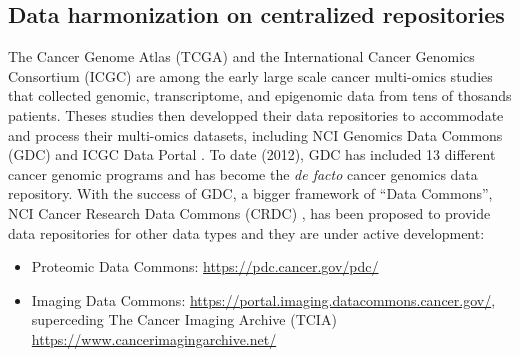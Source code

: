 \subsection{Data harmonization on centralized repositories}
The Cancer Genome Atlas (TCGA) \cite{hutterc_zenklusenjc:CancerGenome2018} and the International Cancer Genomics Consortium (ICGC) \cite{internationalcancergenomeconsortium_yangh:InternationalNetwork2010} are among the early large scale cancer multi-omics studies that collected genomic, transcriptome, and epigenomic data from tens of thosands patients. Theses studies then developped their data repositories to accommodate and process their multi-omics datasets, including NCI Genomics Data Commons (GDC)\footnotemark{} \cite{grossmanrl_staudtlm:SharedVision2016,heathap_grossmanrl:NCIGenomic2021} and ICGC Data Portal \cite{jolyy_chalmersd:DataSharing2012}. To date (2012), GDC has included 13 different cancer genomic programs and has become the \textit{de facto} cancer genomics data repository. With the success of GDC, a bigger framework of ``Data Commons'', NCI Cancer Research Data Commons (CRDC) \cite{hinksoniv_kibbewa:ComprehensiveInfrastructure2017}, has been proposed to provide data repositories for other data types and they are under active development:
\begin{itemize}
    \item Proteomic Data Commons: \url{https://pdc.cancer.gov/pdc/}
    \item Imaging Data Commons: \url{https://portal.imaging.datacommons.cancer.gov/}, superceding The Cancer Imaging Archive (TCIA) \url{https://www.cancerimagingarchive.net/}
\end{itemize}


